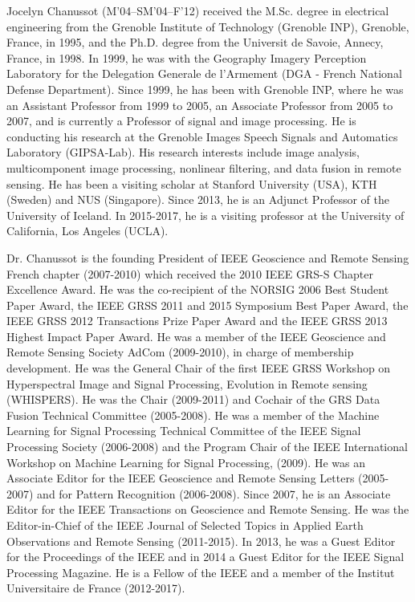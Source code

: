 \documentclass[10pt,twocolumn,twoside]{IEEEtran}
\begin{document}
\begin{IEEEbiography}{Jocelyn Chanussot}
	(M’04–SM’04–F’12) received the M.Sc. degree in electrical engineering from the Grenoble Institute of Technology (Grenoble INP), Grenoble, France, in 1995, and the Ph.D. degree from the Universit de Savoie, Annecy, France, in 1998. In 1999, he was with the Geography Imagery Perception Laboratory for the Delegation Generale de l'Armement (DGA - French National Defense Department). Since 1999, he has been with Grenoble INP, where he was an Assistant Professor from 1999 to 2005, an Associate Professor from 2005 to 2007, and is currently a Professor of signal and image processing. He is conducting his research at the Grenoble Images Speech Signals and Automatics Laboratory (GIPSA-Lab). His research interests include image analysis, multicomponent image processing, nonlinear filtering, and data fusion in remote sensing. He has been a visiting scholar at Stanford University (USA), KTH (Sweden) and NUS (Singapore). Since 2013, he is an Adjunct Professor of the University of Iceland. In 2015-2017, he is a visiting professor at the University of California, Los Angeles (UCLA).

	Dr. Chanussot is the founding President of IEEE Geoscience and Remote Sensing French chapter (2007-2010) which received the 2010 IEEE GRS-S Chapter Excellence Award. He was the co-recipient of the NORSIG 2006 Best Student Paper Award, the IEEE GRSS 2011 and 2015 Symposium Best Paper Award, the IEEE GRSS 2012 Transactions Prize Paper Award and the IEEE GRSS 2013 Highest Impact Paper Award. He was a member of the IEEE Geoscience and Remote Sensing Society AdCom (2009-2010), in charge of membership development. He was the General Chair of the first IEEE GRSS Workshop on Hyperspectral Image and Signal Processing, Evolution in Remote sensing (WHISPERS). He was the Chair (2009-2011) and  Cochair of the GRS Data Fusion Technical Committee (2005-2008). He was a member of the Machine Learning for Signal Processing Technical Committee of the IEEE Signal Processing Society (2006-2008) and the Program Chair of the IEEE International Workshop on Machine Learning for Signal Processing, (2009). He was an Associate Editor for the IEEE Geoscience and Remote Sensing Letters (2005-2007) and for Pattern Recognition (2006-2008). Since 2007, he is an Associate Editor for the IEEE Transactions on Geoscience and Remote Sensing. He was the Editor-in-Chief of the IEEE Journal of Selected Topics in Applied Earth Observations and Remote Sensing (2011-2015). In 2013, he was a Guest Editor for the Proceedings of the IEEE and in 2014 a Guest Editor for the IEEE Signal Processing Magazine. He is a Fellow of the IEEE and a member of the Institut Universitaire de France (2012-2017).
\end{IEEEbiography}
\end{document}
